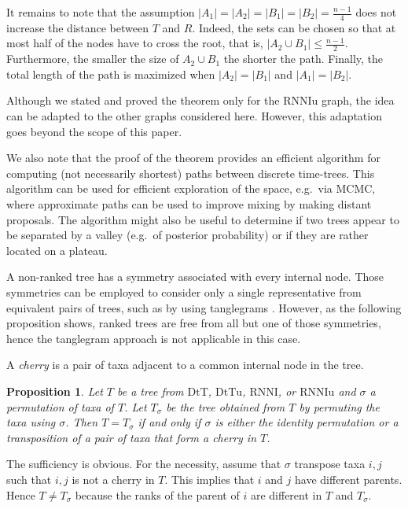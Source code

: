 \documentclass[11pt]{amsart}
\newtheorem{proposition}[lemma]{Proposition}
\theoremstyle{definition}
\newcommand{\rnni}{\mathrm{RNNI}}
\newcommand{\rnniu}{\mathrm{RNNIu}}
\newcommand{\dtt}{\mathrm{DtT}}
\newcommand{\dttu}{\mathrm{DtTu}}
\begin{document}
It remains to note that the assumption $|A_1| = |A_2| = |B_1| = |B_2| = \frac{n-1}{4}$ does not increase the distance between $T$ and $R$.
Indeed, the sets can be chosen so that at most half of the nodes have to cross the root, that is, $|A_2 \cup B_1| \le \frac{n-1}{2}$.
Furthermore, the smaller the size of $A_2 \cup B_1$ the shorter the path.
Finally, the total length of the path is maximized when $|A_2| = |B_1|$ and $|A_1| = |B_2|$.
\endproof

Although we stated and proved the theorem only for the $\rnniu$ graph, the idea can be adapted to the other graphs considered here.
However, this adaptation goes beyond the scope of this paper.

We also note that the proof of the theorem provides an efficient algorithm for computing (not necessarily shortest) paths between discrete time-trees.
This algorithm can be used for efficient exploration of the space, e.g.\ via MCMC, where approximate paths can be used to improve mixing by making distant proposals.
The algorithm might also be useful to determine if two trees appear to be separated by a valley (e.g.\ of posterior probability) or if they are rather located on a plateau.

A non-ranked tree has a symmetry associated with every internal node.
Those symmetries can be employed to consider only a single representative from equivalent pairs of trees, such as by using tanglegrams \autocite{Matsen2015-fn, Whidden2015-es}.
However, as the following proposition shows, ranked trees are free from all but one of those symmetries, hence the tanglegram approach is not applicable in this case.

A \emph{cherry} is a pair of taxa adjacent to a common internal node in the tree.

\begin{proposition}
Let $T$ be a tree from $\dtt$, $\dttu$, $\rnni$, or $\rnniu$ and $\sigma$ a permutation of taxa of $T$.
Let $T_\sigma$ be the tree obtained from $T$ by permuting the taxa using $\sigma$.
Then $T = T_\sigma$ if and only if $\sigma$ is either the identity permutation or a transposition of a pair of taxa that form a cherry in $T$.
\end{proposition}

\proof
The sufficiency is obvious.
For the necessity, assume that $\sigma$ transpose taxa $i,j$ such that $i,j$ is not a cherry in $T$.
This implies that $i$ and $j$ have different parents.
Hence $T \ne T_\sigma$ because the ranks of the parent of $i$ are different in $T$ and $T_\sigma$.
\endproof
\end{document}
